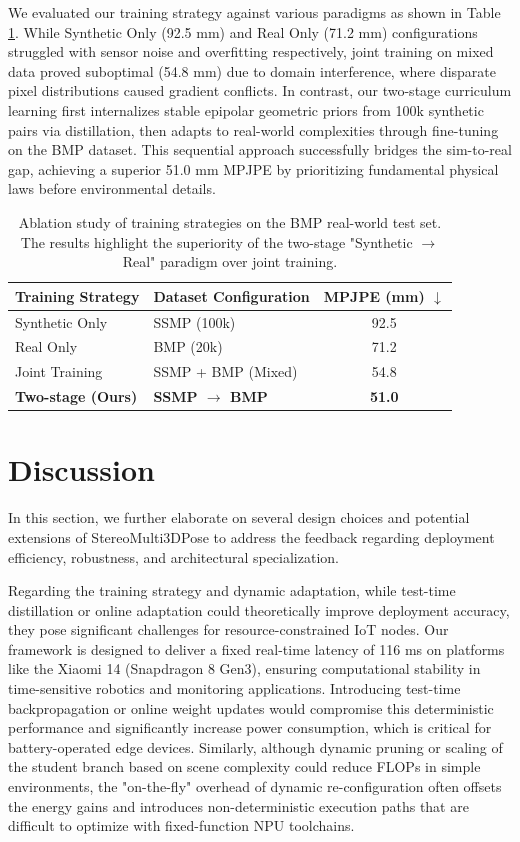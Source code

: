 \documentclass[journal]{IEEEtran}
\begin{document}
We evaluated our training strategy against various paradigms as shown in Table \ref{tab:training_strategy_ablation}. While Synthetic Only (92.5 mm) and Real Only (71.2 mm) configurations struggled with sensor noise and overfitting respectively, joint training on mixed data proved suboptimal (54.8 mm) due to domain interference, where disparate pixel distributions caused gradient conflicts. In contrast, our two-stage curriculum learning first internalizes stable epipolar geometric priors from 100k synthetic pairs via distillation, then adapts to real-world complexities through fine-tuning on the BMP dataset. This sequential approach successfully bridges the sim-to-real gap, achieving a superior 51.0 mm MPJPE by prioritizing fundamental physical laws before environmental details.
\begin{table}[h]
\centering
\caption{Ablation study of training strategies on the BMP real-world test set. The results highlight the superiority of the two-stage "Synthetic $\rightarrow$ Real" paradigm over joint training.}
\label{tab:training_strategy_ablation}
\renewcommand{\arraystretch}{1.2}
\begin{tabular}{llc}
\hline
\textbf{Training Strategy} & \textbf{Dataset Configuration} & \textbf{MPJPE (mm)} $\downarrow$ \\ \hline
Synthetic Only & SSMP (100k) & 92.5 \\
Real Only & BMP (20k) & 71.2 \\
Joint Training & SSMP + BMP (Mixed) & 54.8 \\
\textbf{Two-stage (Ours)} & \textbf{SSMP $\rightarrow$ BMP} & \textbf{51.0} \\ \hline
\end{tabular}
\end{table}
\section{Discussion}

In this section, we further elaborate on several design choices and potential extensions of StereoMulti3DPose to address the feedback regarding deployment efficiency, robustness, and architectural specialization.

Regarding the training strategy and dynamic adaptation, while test-time distillation or online adaptation could theoretically improve deployment accuracy, they pose significant challenges for resource-constrained IoT nodes. Our framework is designed to deliver a fixed real-time latency of 116 ms on platforms like the Xiaomi 14 (Snapdragon 8 Gen3), ensuring computational stability in time-sensitive robotics and monitoring applications. Introducing test-time backpropagation or online weight updates would compromise this deterministic performance and significantly increase power consumption, which is critical for battery-operated edge devices. Similarly, although dynamic pruning or scaling of the student branch based on scene complexity could reduce FLOPs in simple environments, the "on-the-fly" overhead of dynamic re-configuration often offsets the energy gains and introduces non-deterministic execution paths that are difficult to optimize with fixed-function NPU toolchains.
\end{document}
